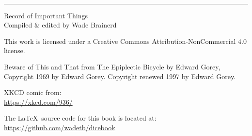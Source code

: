
\par\vspace{\fill} \
\vspace{-.1in} \\ \rule{\textwidth}{.2pt}
\vspace{0.55in}


\large Record of Important Things \\
\normalsize Compiled \& edited by Wade Brainerd

\ccbync

This work is licensed under a Creative Commons Attribution-NonCommercial 4.0 license.

Beware of This and That from The Epiplectic Bicycle by Edward Gorey, Copyright 1969 by Edward Gorey. Copyright renewed 1997 by Edward Gorey.

XKCD comic from: \\
\url{https://xkcd.com/936/}

The \LaTeX\ source code for this book is located at: \\ \url{https://github.com/wadetb/dicebook}

